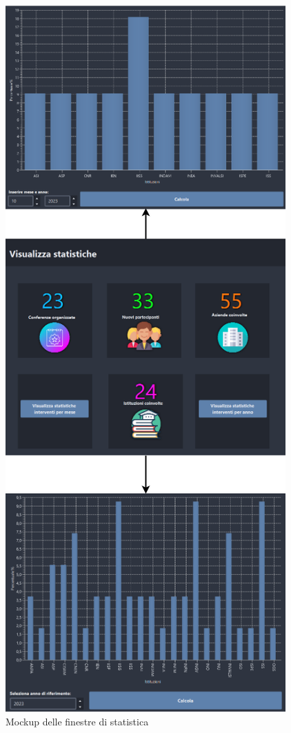 \begin{figure}
	\centering
	\includegraphics[scale=0.5]{Immagini/Mockup/Stats/Flow_Stats.png}
	\caption{Mockup delle finestre di statistica}
\end{figure}

